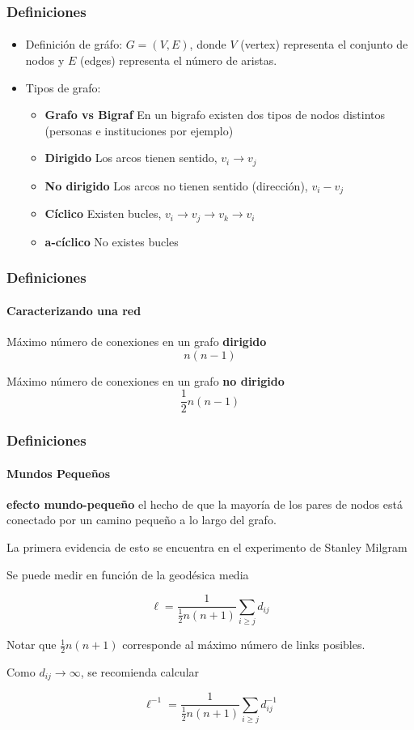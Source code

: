\documentclass[10pt]{beamer}
\begin{document}
\begin{frame}
\frametitle{Definiciones}
\framesubtitle{}
\begin{itemize}
\item Definici\'on de gr\'afo: $G = (V,E)$, donde $V$ (vertex) representa el
conjunto de nodos y $E$ (edges) representa el n\'umero de aristas.
\item Tipos de grafo:
  \begin{itemize}
  \item {\bf Grafo vs Bigraf} En un bigrafo existen dos tipos de nodos distintos (personas e instituciones por ejemplo)
  \item {\bf Dirigido} Los arcos tienen sentido, $v_i \rightarrow v_j$
  \item {\bf No dirigido} Los arcos no tienen sentido (direcci\'on), $v_i - v_j$
  \item {\bf C\'iclico} Existen bucles, $v_i \rightarrow v_j \rightarrow v_k \rightarrow v_i$
  \item {\bf a-c\'iclico} No existes bucles
  \end{itemize}
\end{itemize}

\end{frame}

\begin{frame}
\frametitle{Definiciones}
\framesubtitle{Caracterizando una red}

M\'aximo n\'umero de conexiones en un grafo {\bf dirigido}
\begin{equation}
n(n-1)
\end{equation}

M\'aximo n\'umero de conexiones en un grafo {\bf no dirigido}
\begin{equation}
\frac{1}{2}n(n-1)
\end{equation}
\end{frame}

\begin{frame}
\frametitle{Definiciones}
\framesubtitle{Mundos Peque\~nos}

{\bf efecto mundo-peque\~no} el hecho de que la mayor\'ia de los pares de
nodos est\'a conectado por un camino peque\~no a lo largo del grafo.

La primera evidencia de esto se encuentra en el experimento de Stanley Milgram
\cite{milgram1967} 

Se puede medir en funci\'on de la geod\'esica media

\begin{equation}
\ell = \frac{1}{\frac{1}{2}n(n+1)}\sum_{i\geq j}{d_{ij}}
\end{equation}

Notar que $\frac{1}{2}n(n+1)$ corresponde al m\'aximo n\'umero de links
posibles.

Como $d_{ij} \rightarrow \infty$, se recomienda calcular

\begin{equation}
\ell^{-1} = \frac{1}{\frac{1}{2}n(n+1)}\sum_{i\geq j}{d_{ij}^{-1}}
\end{equation}

\end{frame}
\end{document}
